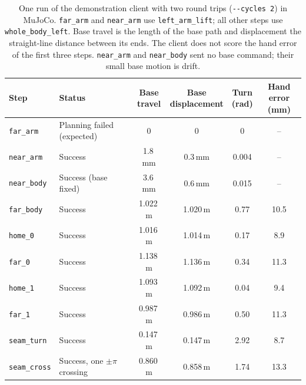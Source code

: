 \documentclass[12pt,a4paper]{article}
\begin{document}
\begin{table}[H]
    \centering
    \small
    \setlength{\tabcolsep}{4pt}
    \begin{tabular}{llcccc}
        \toprule
        Step & Status & \shortstack{Base\\travel} & \shortstack{Base\\displacement} & \shortstack{Turn\\(rad)}
        & \shortstack{Hand\\error (mm)} \\
        \midrule
        \texttt{far\_arm}    & Planning failed (expected)    & 0          & 0          & 0     & --   \\
        \texttt{near\_arm}   & Success                       & 1.8\,mm    & 0.3\,mm    & 0.004 & --   \\
        \texttt{near\_body}  & Success (base fixed)          & 3.6\,mm    & 0.6\,mm    & 0.015 & --   \\
        \texttt{far\_body}   & Success                       & 1.022\,m   & 1.020\,m   & 0.77  & 10.5 \\
        \texttt{home\_0}     & Success                       & 1.016\,m   & 1.014\,m   & 0.17  & 8.9  \\
        \texttt{far\_0}      & Success                       & 1.138\,m   & 1.136\,m   & 0.34  & 11.3 \\
        \texttt{home\_1}     & Success                       & 1.093\,m   & 1.092\,m   & 0.04  & 9.4  \\
        \texttt{far\_1}      & Success                       & 0.987\,m   & 0.986\,m   & 0.50  & 11.3 \\
        \texttt{seam\_turn}  & Success                       & 0.147\,m   & 0.147\,m   & 2.92  & 8.7  \\
        \texttt{seam\_cross} & Success, one $\pm\pi$ crossing & 0.860\,m  & 0.858\,m   & 1.74  & 13.3 \\
        \bottomrule
    \end{tabular}
    \caption{\small{One run of the demonstration client with two round trips (\texttt{-{}-cycles 2}) in
    MuJoCo. \texttt{far\_arm} and \texttt{near\_arm} use \texttt{left\_arm\_lift}; all other steps use
    \texttt{whole\_body\_left}. Base travel is the length of the base path and displacement the
    straight-line distance between its ends. The client does not score the hand error of the first
    three steps. \texttt{near\_arm} and \texttt{near\_body} sent no base command; their small base motion
    is drift.}}
    \label{tab:commander_demo}
\end{table}
\end{document}
